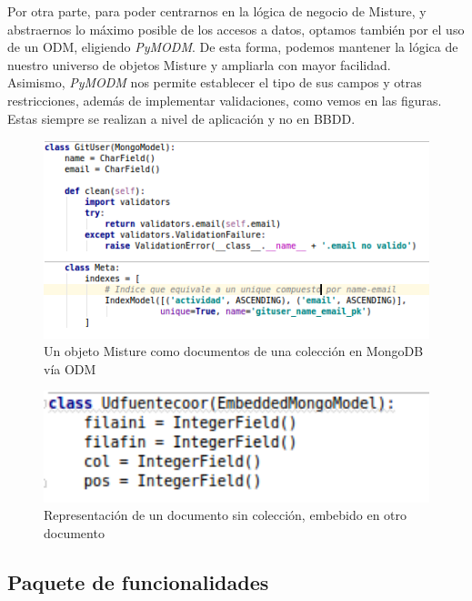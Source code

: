 Por otra parte, para poder centrarnos en la lógica de negocio de Misture, y abstraernos lo máximo posible de los accesos a datos, optamos también por el uso de un ODM, eligiendo \textit{PyMODM}. De esta forma, podemos mantener la lógica de nuestro universo de objetos Misture y ampliarla con mayor facilidad.\\


Asimismo, \textit{PyMODM} nos permite establecer el tipo de sus campos y otras restricciones, además de implementar validaciones, como vemos en las figuras. Estas siempre se realizan a nivel de aplicación y no en BBDD.\\


\begin{figure}[H]
   \centering
   \includegraphics[width=16cm]{img/Selection_026_mongomodel}
   \caption{Un objeto Misture como documentos de una colección en MongoDB vía ODM}
   \label{figura:iter2}
\end{figure}

\begin{figure}[H]
   \centering
   \includegraphics[width=12cm]{img/Selection_027_mongoembdoc}
   \caption{Representación de un documento sin colección, embebido en otro documento}
   \label{figura:mon_emb}
\end{figure}


\subsection{Paquete de funcionalidades} 
\label{subsec:paq_functs}

